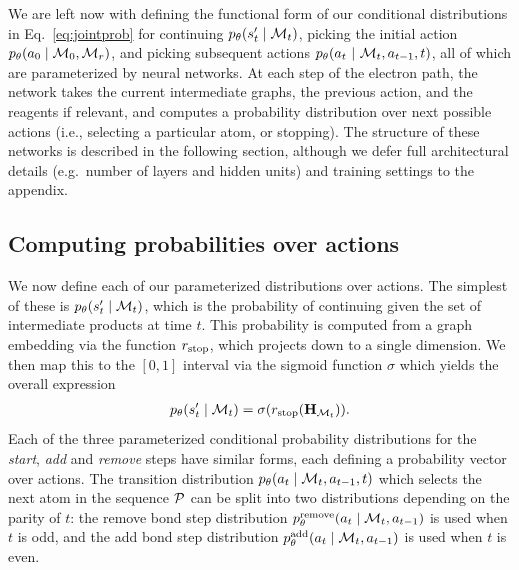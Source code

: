 We are left now with defining the functional form of our conditional distributions in  Eq.~\eqref{eq:jointprob} for continuing $p_\theta(s'_t \mid {\mathcal{M}}_t)$, picking the initial action $p_\theta(a_0 \mid {\mathcal{M}}_0, {\mathcal{M}}_r)$, and picking subsequent actions $p_\theta(a_t~|~{\mathcal{M}}_t, a_{t-1}, t)$, all of which are parameterized by neural networks.
At each step of the electron path, the network takes the current intermediate graphs, 
the previous action, and the reagents if relevant, 
and computes a probability distribution over next possible actions (i.e., selecting a particular atom, or stopping).
The structure of these networks is described in the following section, although we defer full architectural details (e.g.\ number of layers and hidden units) 
and training settings to the appendix.








\subsection{Computing probabilities over actions}

We now define each of our parameterized distributions over actions.
The simplest of these is $p_\theta(s'_t \mid {\mathcal{M}}_t)$, which is the probability of continuing given the set of intermediate products at time $t$. 
This probability is computed from a graph embedding via the function $r_{\textrm{stop}}$, which projects down to a single dimension. We then map this to the $[0,1]$ interval via the sigmoid function $\sigma$ which yields the overall expression
\begin{align}
p_\theta(s'_t \mid {\mathcal{M}}_t) = \sigma(r_{\textrm{stop}}({\mathbf{H}}_{{\mathcal{M}}_t})).
\end{align}
Each of the three parameterized conditional probability distributions for the {\em start}, {\em add} and {\em remove} steps have similar forms, each defining a probability vector over actions.
The transition distribution $p_\theta(a_t \mid  {\mathcal{M}}_t, a_{t-1}, t)$ 
which selects the next atom in the sequence ${\mathcal{P}}$
can be split into two distributions depending on the parity of $t$:
the remove bond step distribution $p_\theta^\textrm{remove}(a_t \mid  {\mathcal{M}}_t, a_{t-1})$ is used when $t$ is odd, 
and the add bond step distribution $p_\theta^\textrm{add}(a_t \mid {\mathcal{M}}_t, a_{t-1})$ is used when $t$ is even. 

